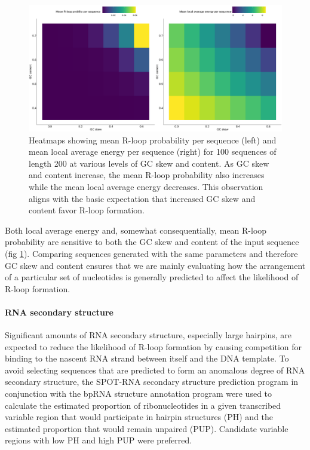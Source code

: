 \documentclass[11pt]{article}
\begin{document}
\begin{figure}[H]
	\includegraphics[width=14cm]{images/plots/rlooper_expect_tile.png}
	\centering
	\caption{Heatmaps showing mean R-loop probability per sequence (left) and mean local average energy per sequence (right) for 100 sequences of length 200 at various levels of GC skew and content. As GC skew and content increase, the mean R-loop probability also increases while the mean local average energy decreases. This observation aligns with the basic expectation that increased GC skew and content favor R-loop formation.}
	\label{fig:rlooper-expect}
\end{figure}

Both local average energy and, somewhat consequentially, mean R-loop probability are sensitive to both the GC skew and content of the input sequence (fig \ref{fig:rlooper-expect}). Comparing sequences generated with the same parameters and therefore GC skew and content ensures that we are mainly evaluating how the arrangement of a particular set of nucleotides is generally predicted to affect the likelihood of R-loop formation.


\paragraph{RNA secondary structure}

Significant amounts of RNA secondary structure, especially large hairpins, are expected to reduce the likelihood of R-loop formation by causing competition for binding to the nascent RNA strand between itself and the DNA template. To avoid selecting sequences that are predicted to form an anomalous degree of RNA secondary structure, the SPOT-RNA secondary structure prediction program in conjunction with the bpRNA structure annotation program \cite{Singh2019, Danaee2018} were used to calculate the estimated proportion of ribonucleotides in a given transcribed variable region that would participate in hairpin structures (PH) and the estimated proportion that would remain unpaired (PUP). Candidate variable regions with low PH and high PUP were preferred.
\end{document}
